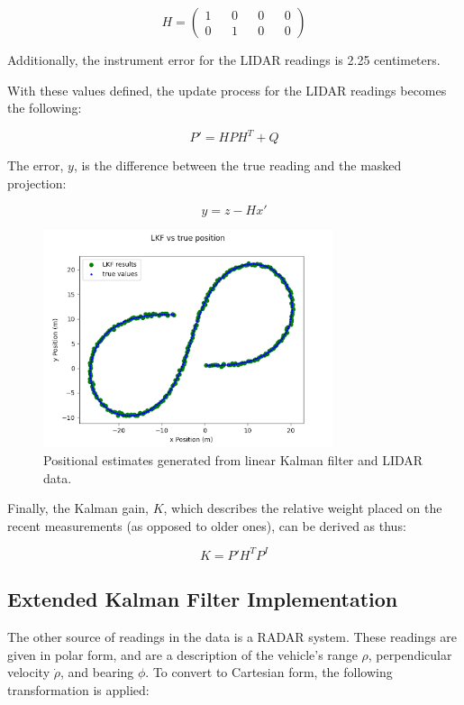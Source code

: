 \documentclass{article}
\begin{document}
$$
H = \begin{pmatrix}
1 && 0 && 0 && 0\\
0 && 1 && 0 && 0
\end{pmatrix}
$$

Additionally, the instrument error for the LIDAR readings is 2.25 centimeters.

With these values defined, the update process for the LIDAR readings becomes the following:

$$P'=HPH^T+Q$$

The error, $y$, is the difference between the true reading and the masked projection:

$$y=z-Hx'$$

\begin{figure}[ht]
\begin{minipage}[b]{1.0\linewidth}
  \centering
  \centerline{\includegraphics[width=8.5cm]{1.png}}
\end{minipage}
\caption{Positional estimates generated from linear Kalman filter and LIDAR data.}
\end{figure}

Finally, the Kalman gain, $K$, which describes the relative weight placed on the recent measurements (as opposed to older ones), can be derived as thus:

$$K=P'H^TP^I$$



\subsection{Extended Kalman Filter Implementation}
\label{ssec:ekfimp}

The other source of readings in the data is a RADAR system. These readings are given in polar form, and are a description of the vehicle's range $\rho$, perpendicular velocity $\dot{\rho}$, and bearing $\phi$. To convert to Cartesian form, the following transformation is applied:
\end{document}
